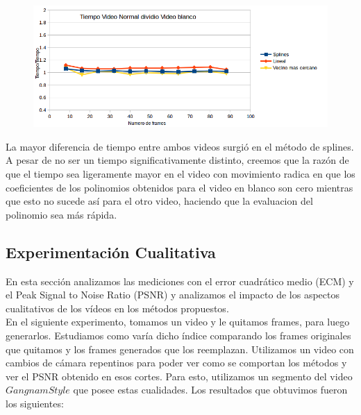 \begin{figure}
  \vspace{-20pt}
  \begin{center}
    \includegraphics[scale= 0.6]{imagenes/aumentandoFramesMessiSobreWhite.png}
  \end{center}
  \vspace{-10pt}
  \vspace{-10pt}
\end{figure}

La mayor diferencia de tiempo entre ambos videos surgió en el método de splines. A pesar de no ser un tiempo significativamente distinto, creemos que la razón de que el tiempo sea ligeramente mayor en el video con movimiento radica en que los coeficientes de los polinomios obtenidos para el video en blanco son cero mientras que esto no sucede así para el otro video, haciendo que la evaluacion del polinomio sea más rápida.

\subsection{Experimentación Cualitativa}

En esta sección analizamos las mediciones con el error cuadrático medio (ECM) y el Peak Signal to Noise Ratio (PSNR) y analizamos el impacto de los aspectos cualitativos de los vídeos en los métodos propuestos. \\

En el siguiente experimento, tomamos un video y le quitamos frames, para luego generarlos. Estudiamos como varía dicho índice comparando los frames originales que quitamos y los frames generados que los reemplazan. Utilizamos un video con cambios de cámara repentinos para poder ver como se comportan los métodos y ver el PSNR obtenido en esos cortes. Para esto, utilizamos un segmento del video $Gangnam Style$ que posee estas cualidades.
Los resultados que obtuvimos fueron los siguientes:


